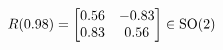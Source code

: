 \documentclass[preview]{standalone}
\begin{document}
\begin{align*}
\special{dvisvgm:raw <g id='unique000'>}R(0.98) = \begin{bmatrix} 0.56 & -0.83 \\ 0.83 & 0.56 \end{bmatrix} \in \text{SO}(2)\special{dvisvgm:raw </g>}
\end{align*}
\end{document}

